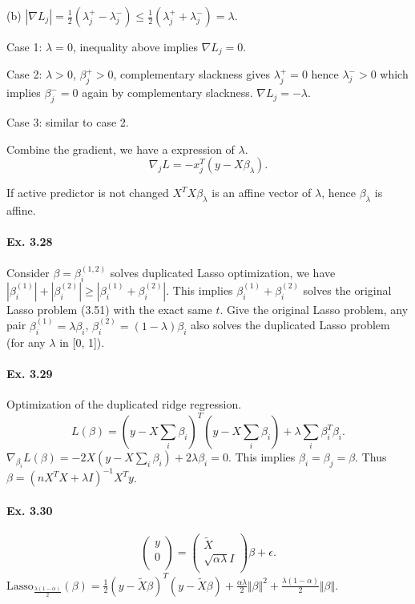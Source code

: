 (b) $|\nabla L_{j}| = \frac{1}{2} (\lambda_{j}^+ - \lambda_{j}^-) \leq \frac{1}{2} (\lambda_{j}^+ + \lambda_{j}^-)  = \lambda$.

Case 1: $\lambda = 0$, inequality above implies $\nabla L_{j} = 0.$

Case 2: $\lambda > 0$, $\beta_{j}^+ > 0$, complementary slackness gives $\lambda_{j}^{+} = 0$ hence $\lambda_{j}^{-} > 0$ which implies $\beta_{j}^{-} = 0$ again by complementary slackness. $\nabla L_{j} = -\lambda$.

Case 3: similar to case 2.

Combine the gradient, we have a expression of $\lambda$.
$$\nabla_{j}L = - x_{j}^T (y - X\beta_\lambda).$$

If active predictor is not changed $X^TX\beta_\lambda$ is an affine vector of $\lambda$, hence $\beta_\lambda$ is affine.

\paragraph*{Ex. 3.28} Consider $\beta = \beta_{i}^{(1, 2)}$ solves duplicated Lasso optimization, we have $|\beta_{i}^{(1)}| + |\beta_{i}^{(2)}| \geq |\beta_{i}^{(1)} + \beta_{i}^{(2)}|.$
This implies $\beta_{i}^{(1)} + \beta_{i}^{(2)}$ solves the original Lasso problem (3.51) with the exact same $t$. Give the original Lasso problem, any pair $ \beta_{i}^{(1)} = \lambda \beta_i$, $ \beta_{i}^{(2)} = (1 - \lambda) \beta_i$ also solves the duplicated Lasso problem (for any $\lambda$ in [0, 1]).

\paragraph*{Ex. 3.29} Optimization of the duplicated ridge regression.
$$L(\beta)=(y-X\sum_{i}\beta_{i})^T(y-X\sum_{i}\beta_{i}) + \lambda \sum_{i}\beta_{i}^T \beta_{i}.$$
$\nabla_{\beta_{i}}L(\beta) = -2 X (y - X\sum_{i} \beta_{i}) + 2 \lambda \beta_{i} = 0.$ This implies $\beta_{i} = \beta_{j}=\beta$. Thus $\beta = (n X^T X +\lambda I)^{-1}X^Ty$.

\paragraph*{Ex. 3.30}

$$
    \left(
    \begin{array}{c}
            y \\
            0 \\
        \end{array}
    \right)
    =
    \left(
    \begin{array}{c}
            \widetilde{X}    \\
            \sqrt{\alpha\lambda} I \\
        \end{array}
    \right)
    \beta + \epsilon.
$$
$\mbox{Lasso}_{\frac{\lambda(1-\alpha)}{2}}(\beta)=\frac{1}{2}(y-\tilde{X}\beta)^T(y-\tilde{X}\beta)  + \frac{\alpha\lambda }{2}\Vert\beta\Vert^2 + \frac{\lambda(1-\alpha)}{2} \Vert\beta\Vert$.